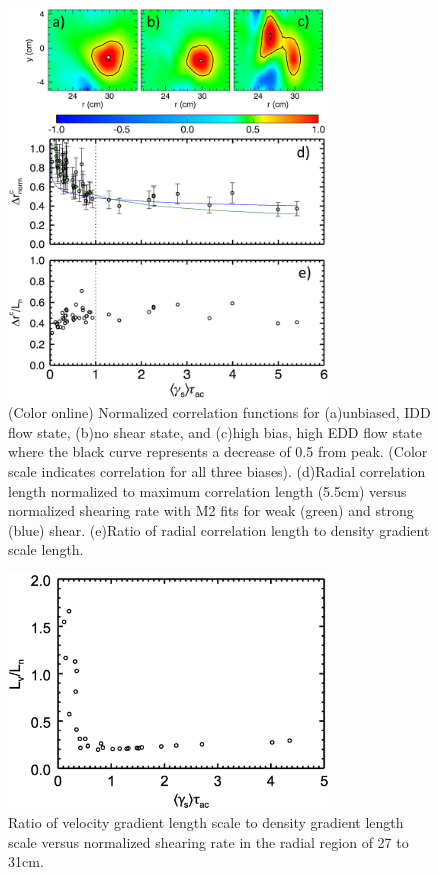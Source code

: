 \documentclass[aip,pop,amsmath,amssymb,peprint,superscriptaddress]{revtex4-1} %
\begin{document}
\begin{figure}[!htbp]
\centerline{
\includegraphics[width=8.5cm]{figure7.eps}}
\caption{\label{fig:radcorr} (Color online) Normalized correlation functions for (a)unbiased, IDD flow state, (b)no shear state, and (c)high bias, high EDD flow state where the black curve represents a decrease of 0.5 from peak. (Color scale indicates correlation for all three biases). (d)Radial correlation length normalized to maximum correlation length (5.5cm) versus normalized shearing rate with M2 fits for weak (green) and strong (blue) shear. (e)Ratio of radial correlation length to density gradient scale length.}
\end{figure}

\begin{figure}[!htbp]
\centerline{
\includegraphics[width=8.5cm]{figure8.eps}}
\caption{\label{fig:LgammaLn} Ratio of velocity gradient length scale
  to density gradient length scale versus normalized shearing rate in the radial region of 27 to 31cm.}
\end{figure}
\end{document}
